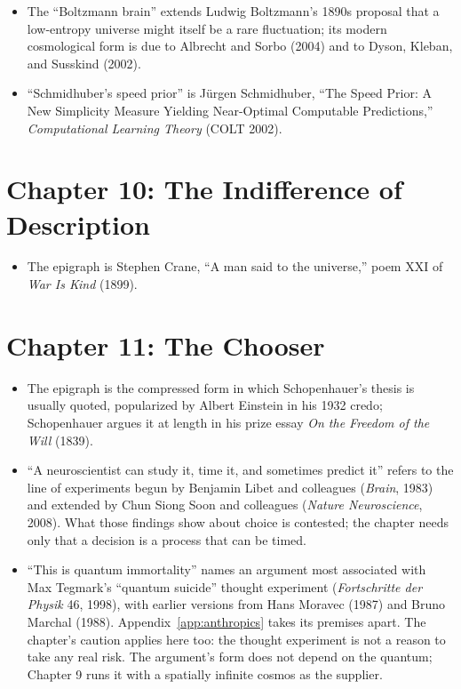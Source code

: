 \begin{itemize}
\item The ``Boltzmann brain'' extends Ludwig Boltzmann's 1890s proposal that a low-entropy universe might itself be a rare fluctuation; its modern cosmological form is due to Albrecht and Sorbo (2004) and to Dyson, Kleban, and Susskind (2002).
\item ``Schmidhuber's speed prior'' is J\"urgen Schmidhuber, ``The Speed Prior: A New Simplicity Measure Yielding Near-Optimal Computable Predictions,'' \textit{Computational Learning Theory} (COLT 2002).
\end{itemize}

\section*{Chapter 10: The Indifference of Description}

\begin{itemize}
\setlength{\itemsep}{0.5em}
\item The epigraph is Stephen Crane, ``A man said to the universe,'' poem XXI of \textit{War Is Kind} (1899).
\end{itemize}

\section*{Chapter 11: The Chooser}

\begin{itemize}
\setlength{\itemsep}{0.5em}
\item The epigraph is the compressed form in which Schopenhauer's thesis is usually quoted, popularized by Albert Einstein in his 1932 credo; Schopenhauer argues it at length in his prize essay \textit{On the Freedom of the Will} (1839).
\item ``A neuroscientist can study it, time it, and sometimes predict it'' refers to the line of experiments begun by Benjamin Libet and colleagues (\textit{Brain}, 1983) and extended by Chun Siong Soon and colleagues (\textit{Nature Neuroscience}, 2008). What those findings show about choice is contested; the chapter needs only that a decision is a process that can be timed.
\item ``This is quantum immortality'' names an argument most associated with Max Tegmark's ``quantum suicide'' thought experiment (\textit{Fortschritte der Physik} 46, 1998), with earlier versions from Hans Moravec (1987) and Bruno Marchal (1988). Appendix~\ref{app:anthropics} takes its premises apart. The chapter's caution applies here too: the thought experiment is not a reason to take any real risk. The argument's form does not depend on the quantum; Chapter 9 runs it with a spatially infinite cosmos as the supplier.
\end{itemize}

